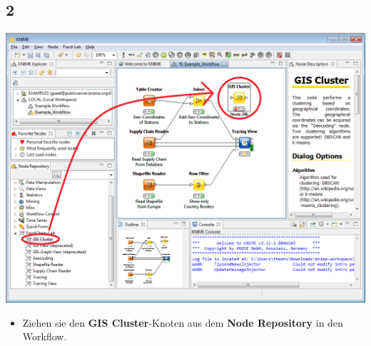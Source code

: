 \documentclass{beamer}
\begin{document}
\subsection{2}
\begin{frame}
	\begin{center}
  		\includegraphics[height=0.6\textheight]{2.png}
	\end{center}
	\begin{itemize}
		\item Ziehen sie den \textbf{GIS Cluster}-Knoten aus dem \textbf{Node Repository} in den Workflow.
	\end{itemize}
\end{frame}
\end{document}
